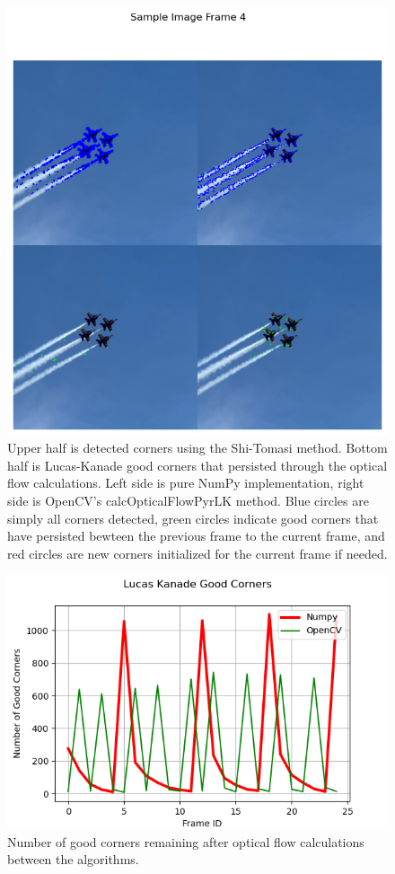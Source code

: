 \documentclass[11pt, conference, letterpaper]{IEEEtran}
\begin{document}
\onecolumn
\begin{figure}[h]
    \centering
    \includegraphics[width=0.8\linewidth]{images/sample_image_4.png}
    \caption{Upper half is detected corners using the Shi-Tomasi method. Bottom half is Lucas-Kanade good corners that persisted through the optical flow calculations. Left side is pure NumPy implementation, right side is OpenCV's calcOpticalFlowPyrLK method. Blue circles are simply all corners detected, green circles indicate good corners that have persisted bewteen the previous frame to the current frame, and red circles are new corners initialized for the current frame if needed.}
    \label{fig:sample_5}
\end{figure}
\twocolumn

\begin{figure}[t]
    \centering
    \includegraphics[width=0.9\linewidth]{images/lk_good_corners.png}
    \caption{Number of good corners remaining after optical flow calculations between the algorithms.}
    \label{fig:lk-corners}
\end{figure}
\end{document}
